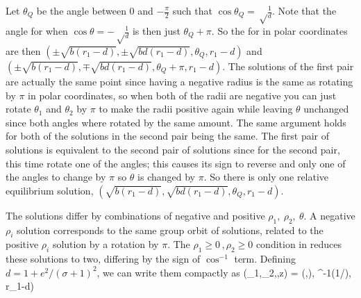 {Let $\theta_Q$ be the angle between $0$ and $-\frac{\pi}{2}$ such that $\cos \theta_Q = \sqrt \frac{1}{d}$. Note that the angle for when $\cos \theta = - \sqrt \frac{1}{d}$ is then just $\theta_Q +\pi$.
So the \reqva for \cLe in polar coordinates are then $\left(\pm \sqrt{b \left(r_1 -d\right)},\pm \sqrt{b d \left(r_1 -d\right)},\theta_Q, r_1 -d\right)$ and $\left(\pm \sqrt{b \left(r_1 -d\right)},\mp \sqrt{b d \left(r_1 -d\right)},\theta_Q +\pi, r_1 -d \right)$. The solutions of the first pair are actually the same point since having a negative radius is the same as rotating by $\pi$ in polar coordinates, so when both of the radii are negative you can just rotate $\theta_1$ and $\theta_2$ by $\pi$ to make the radii positive again while leaving $\theta$ unchanged since both angles where rotated by the same amount. The same argument holds for both of the solutions in the second pair being the same. The first pair of solutions is equivalent to the second pair of solutions since for the second pair, this time rotate one of the angles; this causes its sign to reverse and only one of the angles to change by $\pi$ so $\theta$ is changed by $\pi$. So there is only one relative equilibrium solution, $\left(\sqrt{b \left(r_1 -d\right)},\sqrt{b d \left(r_1 -d\right)},\theta_Q, r_1 -d\right)$.


The solutions differ by combinations of negative and positive
$\rho_1,\ \rho_2,\ \theta$. A negative $\rho_i$ solution
corresponds to the same group orbit of solutions, related to
the positive $\rho_i$ solution by a rotation by $\pi$. The
$\rho_1 \geq 0 \,,\rho_2 \geq 0$ condition in
 reduces these solutions to two,
differing by the sign of $\cos ^{-1}$ term. Defining $d=1 +
{e^2}/{(\sigma +1)^2}$, we can write them compactly
as
\beq
(\rho_1,\rho_2,\theta,z) =
\left(,),
      \pm \cos^{-1}\left({1}/{}\right),
      r_1-d\right)
\label{eq:E1-PC}
\eeq
}



